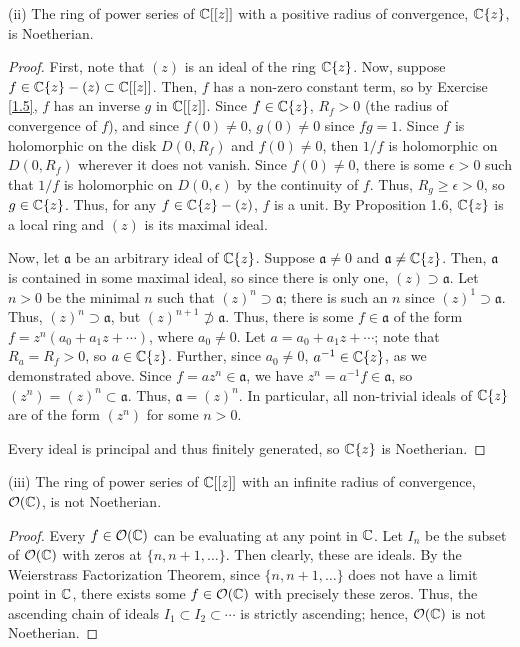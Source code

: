 (ii) The ring of power series of $\mathbb{C}[[z]]$ with a positive radius of convergence, $\mathbb{C}\{z\}$, is Noetherian.

\begin{proof}
First, note that $(z)$ is an ideal of the ring $\mathbb{C}\{z\}$. Now, suppose $f \in \mathbb{C}\{z\} - (z) \subset \mathbb{C}[[z]]$. Then, $f$ has a non-zero constant term, so by Exercise \ref{1.5},
$f$ has an inverse $g$ in $\mathbb{C}[[z]]$. Since $f \in \mathbb{C}\{z\}$, $R_f > 0$ (the radius of convergence of $f$), and since $f(0) \neq 0$, $g(0) \neq 0$ since $fg = 1$. Since $f$ is 
holomorphic on the disk $D(0,R_f)$ and $f(0) \neq 0$, then $1/f$ is holomorphic on $D(0,R_f)$ wherever it does not vanish. Since $f(0) \neq 0$, there is some $\epsilon > 0$
such that $1/f$ is holomorphic on $D(0,\epsilon)$ by the continuity of $f$. Thus, $R_g \ge \epsilon > 0$, so $g \in \mathbb{C}\{z\}$. Thus, for any $f \in \mathbb{C}\{z\} - (z)$, $f$ is a unit.
By Proposition 1.6, $\mathbb{C}\{z\}$ is a local ring and $(z)$ is its maximal ideal.

Now, let $\mathfrak{a}$ be an arbitrary ideal of $\mathbb{C}\{z\}$. Suppose $\mathfrak{a} \neq 0$ and $\mathfrak{a} \neq \mathbb{C}\{z\}$. Then, $\mathfrak{a}$ is contained in some maximal ideal,
so since there is only one, $(z) \supset \mathfrak{a}$. Let $n > 0$ be the minimal $n$ such that $(z)^n \supset \mathfrak{a}$; there is such an $n$ since $(z)^1 \supset \mathfrak{a}$.
Thus, $(z)^n \supset \mathfrak{a}$, but $(z)^{n+1} \not\supset \mathfrak{a}$. Thus, there is some $f \in \mathfrak{a}$ of the form $f = z^n(a_0 + a_1 z + \cdots)$, where $a_0 \neq 0$.
Let $a = a_0 + a_1 z + \cdots$; note that $R_a = R_f > 0$, so $a \in \mathbb{C}\{z\}$. Further, since $a_0 \neq 0$, $a^{-1} \in \mathbb{C}\{z\}$, as we demonstrated above. Since 
$f = a z^n \in \mathfrak{a}$, we have $z^n = a^{-1}f \in \mathfrak{a}$, so $(z^n) = (z)^n \subset \mathfrak{a}$. Thus, $\mathfrak{a} = (z)^n$. In particular, all non-trivial ideals
of $\mathbb{C}\{z\}$ are of the form $(z^n)$ for some $n > 0$.

Every ideal is principal and thus finitely generated, so $\mathbb{C}\{z\}$ is Noetherian.
\end{proof}

(iii) The ring of power series of $\mathbb{C}[[z]]$ with an infinite radius of convergence, $\mathcal{O}(\mathbb{C})$, is not Noetherian.

\begin{proof}
Every $f \in \mathcal{O}(\mathbb{C})$ can be evaluating at any point in $\mathbb{C}$. Let $I_n$ be the subset of $\mathcal{O}(\mathbb{C})$ with zeros at $\{n, n+1, \ldots\}$. Then clearly, these are ideals. 
By the Weierstrass Factorization Theorem, since $\{n,n+1,\ldots\}$ does not have a limit point in $\mathbb{C}$, there exists some $f \in \mathcal{O}(\mathbb{C})$ with precisely these zeros. 
Thus, the ascending chain of ideals $I_1 \subset I_2 \subset \cdots$ is strictly ascending; hence, $\mathcal{O}(\mathbb{C})$ is not Noetherian.
\end{proof}

